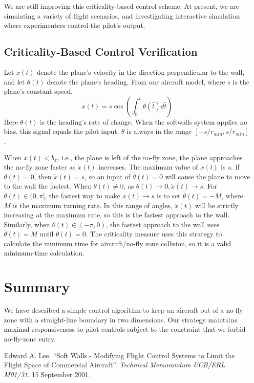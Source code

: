 \documentclass[11pt]{article}
\begin{document}
We are still improving this criticality-based control scheme. At
present, we are simulating a variety of flight scenarios, and
investigating interactive simulation where experimenters control the
pilot's output.


\subsection{Criticality-Based Control Verification}

Let $\dot{x}(t)$ denote the plane's velocity in the direction
perpendicular to the wall, and let $\theta(t)$ denote the plane's
heading.  From our aircraft model, where $s$ is the plane's constant
speed,
\[
\dot{x}(t) = s \cos{(\int_{0}^{t}{\dot{\theta}}(\hat{t})d\hat{t})}
\]
Here $\dot{\theta}(t)$ is the heading's rate of change.  When the
softwalls system applies no bias, this signal equals the pilot input.
$\theta$ is always in the range $[-s / r_{min}, s / r_{min}]$.

When $x(t) < b_{x}$, i.e., the plane is left of the no-fly zone, the
plane approaches the no-fly zone faster as $\dot{x}(t)$ increases.
The maximum value of $\dot{x}(t)$ is $s$.  If $\theta(t) = 0$, then
$\dot{x}(t) = s$, so an input of $\dot{\theta}(t) = 0$ will cause the
plane to move to the wall the fastest.  When $\theta(t) \neq 0$, as
$\theta(t) \rightarrow 0, \dot{x}(t) \rightarrow s$.  For $\theta(t)
\in (0,\pi]$, the fastest way to make $x(t) \rightarrow s$ is to set
$\dot{\theta}(t) = -M$, where $M$ is the maximum turning rate.  In
this range of angles, $\dot{x}(t)$ will be strictly increasing at the
maximum rate, so this is the fastest approach to the wall.  Similarly,
when $\theta(t) \in (-\pi, 0)$, the fastest approach to the wall uses
$\dot{\theta}(t) = M$ until $\theta(t) = 0$.  The criticality measure
uses this strategy to calculate the minimum time for aircraft/no-fly
zone collision, so it is a valid minimum-time calculation.


\section{Summary}

We have described a simple control algorithm to keep an aircraft out
of a no-fly zone with a straight-line boundary in two dimensions.  Our
strategy maintains maximal responsiveness to pilot controls subject to
the constraint that we forbid no-fly-zone entry.

\begin{thebibliography}{Lee 2001}

Edward A. Lee.  ``Soft Walls - Modifying Flight Control Systems to
Limit the Flight Space of Commercial Aircraft''.  \textit{Technical
Memorandum UCB/ERL M01/31}.  15 September 2001.

\end{thebibliography}
\end{document}
